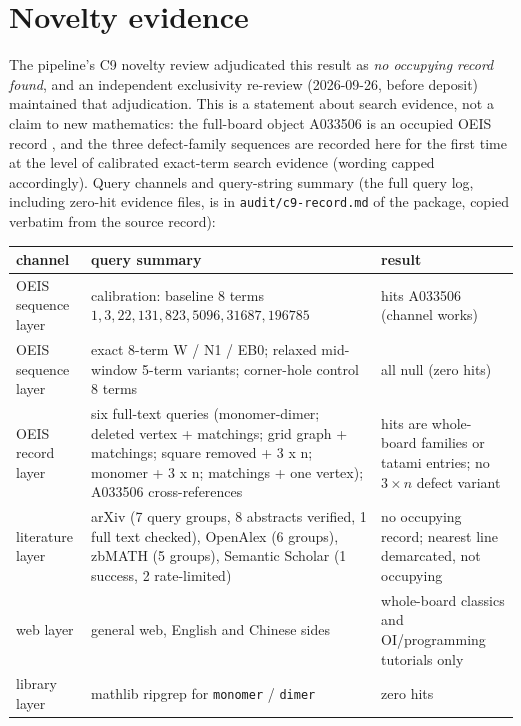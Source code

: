 \documentclass[11pt]{article}
\begin{document}
\section{Novelty evidence}

The pipeline's C9 novelty review adjudicated this result as \emph{no
occupying record found}, and an independent exclusivity re-review
(2026-09-26, before deposit) maintained that adjudication. This is a
statement about search evidence, not a claim to new mathematics: the
full-board object A033506 is an occupied OEIS record \cite{oeis-a033506},
and the three defect-family sequences are recorded here for the first time at
the level of calibrated exact-term search evidence (wording capped
accordingly). Query channels and query-string summary (the full query log,
including zero-hit evidence files, is in \texttt{audit/c9-record.md} of the
package, copied verbatim from the source record):

\begin{center}
\begin{tabular}{p{}p{}p{}}
\hline
channel & query summary & result \\
\hline
OEIS sequence layer & calibration: baseline 8 terms
$1,3,22,131,823,5096,31687,196785$ & hits A033506 (channel works) \\
OEIS sequence layer & exact 8-term W / N1 / EB0; relaxed mid-window 5-term
variants; corner-hole control 8 terms & all null (zero hits) \\
OEIS record layer & six full-text queries (monomer-dimer; deleted vertex +
matchings; grid graph + matchings; square removed + 3 x n; monomer + 3 x n;
matchings + one vertex); A033506 cross-references & hits are whole-board
families or tatami entries; no $3\times n$ defect variant \\
literature layer & arXiv (7 query groups, 8 abstracts verified, 1 full text
checked), OpenAlex (6 groups), zbMATH (5 groups), Semantic Scholar (1 success,
2 rate-limited) & no occupying record; nearest line
\cite{oh-2019,tzeng-wu-2003,wu-2006} demarcated, not occupying \\
web layer & general web, English and Chinese sides & whole-board classics and
OI/programming tutorials only \\
library layer & mathlib ripgrep for \texttt{monomer} / \texttt{dimer} & zero
hits \\
\hline
\end{tabular}
\end{center}
\end{document}
